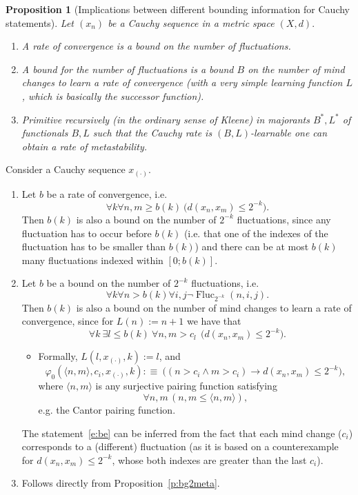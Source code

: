 \documentclass[1p]{elsarticle}
\DeclareMathOperator{\Fluc}{Fluc}
\theoremstyle{plain}
\newtheorem{prop}[thm]{Proposition}
\theoremstyle{definition}
\theoremstyle{remark}
\renewenvironment{proof}[1][]{\noindent{\bf Proof{#1}. }}{\nopagebreak[4]{\hspace*{\fill}
  $\Box$              %
 }{\vspace{2ex}}}
\renewcommand{\phi}{\varphi}
\theoremstyle{definition}
\begin{document}
{\begin{prop}[Implications between different bounding information 
for Cauchy statements] \label{prop.hierarchy}
Let $(x_n)$ be a Cauchy sequence in a metric space $(X,d).$ 
\begin{enumerate}
\item A rate of convergence is a bound on the number of fluctuations.
\item A bound for the number of fluctuations is a bound $B$ 
on the number of mind changes to learn a rate of convergence (with a very 
simple learning function $L$, which is basically the successor function).
\item 
Primitive recursively (in the ordinary sense of Kleene) in majorants 
$B^*,L^*$ of functionals $B,L$ such that the Cauchy rate is $(B,L)$-learnable 
one can obtain a rate of metastability. 
\end{enumerate}
\end{prop}
\begin{proof}
Consider a Cauchy sequence $x_{(\cdot)}$.
\begin{enumerate}
\item Let $b$ be a rate of convergence, i.e.
\[ \forall k \forall n,m\geq b(k)\ \big( d(x_n,x_m)\leq 2^{-k}\big). \]
Then $b(k)$ is also a bound on the number of $2^{-k}$ fluctuations, since any fluctuation has to occur before $b(k)$ (i.e. that one of the indexes of the 
fluctuation has to be smaller than $b(k)$) and there can be at most $b(k)$ many fluctuations indexed within $[0;b(k)]$.
\item Let $b$ be a bound on the number of $2^{-k}$ fluctuations, i.e.
\[ \forall k \forall n>b(k) \forall i,j \neg\Fluc_{2^{-k}}(n,i,j). \]
Then $b(k)$ is also a bound on the number of mind changes to learn a rate of convergence, since for 
$L(n):=n+1$ we have that
\[ \forall k\ \exists l\leq b(k)\ \forall n,m>c_l\ \ \big(  d(x_n,x_m)\leq 2^{-k}\big). \tag{BE}\label{e:be}\]
%
\begin{itemize}
\item{ }
Formally, $L(l,x_{(\cdot)},k):=l$, and
\[
\phi_0(\langle n,m\rangle,c_i,x_{(\cdot)},k):\equiv\ \big((n>c_i \wedge m>c_i) \rightarrow d(x_n,x_m)\leq 2^{-k}\big),
\]
where $\langle n,m\rangle$ is any surjective pairing function satisfying
\[
\forall n,m \,(n,m\le \langle n,m\rangle),\] e.g. the Cantor pairing function.
\end{itemize}
%
The statement~\eqref{e:be} can be inferred from the fact that each mind change ($c_i$) corresponds to a (different) fluctuation (as it is based on a counterexample for $d(x_n,x_m)\leq 2^{-k}$, whose both indexes are greater than the last $c_i$).
\item Follows directly from Proposition~\ref{p:bg2meta}.
\end{enumerate}
\end{proof}


}
\end{document}

